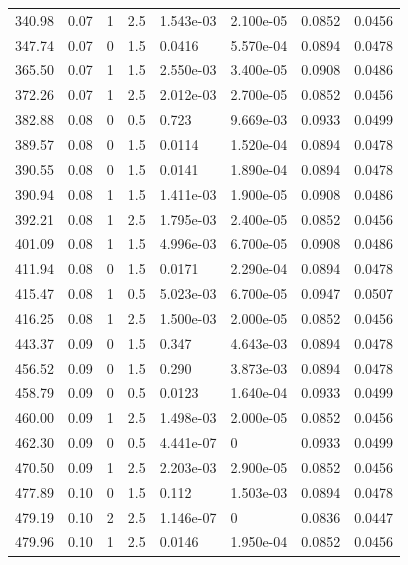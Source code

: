 \documentclass[preview]{standalone}
\begin{document}
{{{\begin{tabular}{L{1.2cm}C{1.2cm} C{0.3cm}C{0.5cm} C{1.4cm}C{1.4cm} C{1.4cm}C{1.4cm}}
  340.98  &  0.07  & 1     & 2.5 &  1.543e-03  & 2.100e-05  & 0.0852 &  0.0456   \\ 
  347.74  &  0.07  & 0     & 1.5 &  0.0416  & 5.570e-04  & 0.0894 &  0.0478   \\ 
  365.50  &  0.07  & 1     & 1.5 &  2.550e-03  & 3.400e-05  & 0.0908 &  0.0486   \\ 
  372.26  &  0.07  & 1     & 2.5 &  2.012e-03  & 2.700e-05  & 0.0852 &  0.0456   \\ 
  382.88  &  0.08  & 0     & 0.5 &  0.723  & 9.669e-03  & 0.0933 &  0.0499   \\ 
  389.57  &  0.08  & 0     & 1.5 &  0.0114  & 1.520e-04  & 0.0894 &  0.0478   \\ 
  390.55  &  0.08  & 0     & 1.5 &  0.0141  & 1.890e-04  & 0.0894 &  0.0478   \\ 
  390.94  &  0.08  & 1     & 1.5 &  1.411e-03  & 1.900e-05  & 0.0908 &  0.0486   \\ 
  392.21  &  0.08  & 1     & 2.5 &  1.795e-03  & 2.400e-05  & 0.0852 &  0.0456   \\ 
  401.09  &  0.08  & 1     & 1.5 &  4.996e-03  & 6.700e-05  & 0.0908 &  0.0486   \\ 
  411.94  &  0.08  & 0     & 1.5 &  0.0171  & 2.290e-04  & 0.0894 &  0.0478   \\ 
  415.47  &  0.08  & 1     & 0.5 &  5.023e-03  & 6.700e-05  & 0.0947 &  0.0507   \\ 
  416.25  &  0.08  & 1     & 2.5 &  1.500e-03  & 2.000e-05  & 0.0852 &  0.0456   \\ 
  443.37  &  0.09  & 0     & 1.5 &  0.347  & 4.643e-03  & 0.0894 &  0.0478   \\ 
  456.52  &  0.09  & 0     & 1.5 &  0.290  & 3.873e-03  & 0.0894 &  0.0478   \\ 
  458.79  &  0.09  & 0     & 0.5 &  0.0123  & 1.640e-04  & 0.0933 &  0.0499   \\ 
  460.00  &  0.09  & 1     & 2.5 &  1.498e-03  & 2.000e-05  & 0.0852 &  0.0456   \\ 
  462.30  &  0.09  & 0     & 0.5 &  4.441e-07  & 0  & 0.0933 &  0.0499   \\ 
  470.50  &  0.09  & 1     & 2.5 &  2.203e-03  & 2.900e-05  & 0.0852 &  0.0456   \\ 
  477.89  &  0.10  & 0     & 1.5 &  0.112  & 1.503e-03  & 0.0894 &  0.0478   \\ 
  479.19  &  0.10  & 2     & 2.5 &  1.146e-07  & 0  & 0.0836 &  0.0447   \\ 
  479.96  &  0.10  & 1     & 2.5 &  0.0146  & 1.950e-04  & 0.0852 &  0.0456   \\ 

\end{tabular}}}}
\end{document}
